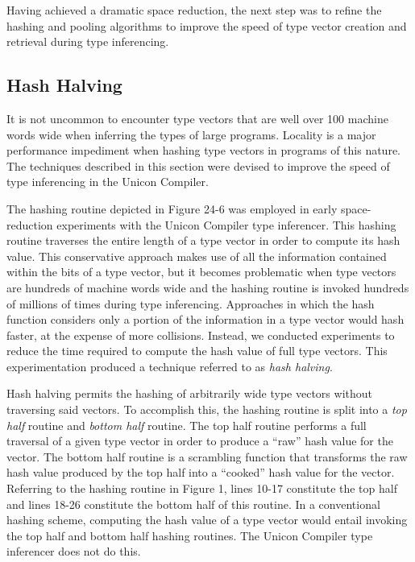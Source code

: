 Having achieved a dramatic space reduction, the next step was to
refine the hashing and pooling algorithms to improve the speed of type
vector creation and retrieval during type inferencing.

\subsection{Hash Halving}

It is not uncommon to encounter type vectors that are well over 100
machine words wide when inferring the types of large
programs. Locality is a major performance impediment when hashing type
vectors in programs of this nature. The techniques described in this
section were devised to improve the speed of type inferencing in the
Unicon Compiler.

The hashing routine depicted in Figure 24-6 was employed in early
space-reduction experiments with the Unicon Compiler type
inferencer. This hashing routine traverses the entire length of a type
vector in order to compute its hash value. This conservative approach
makes use of all the information contained within the bits of a type
vector, but it becomes problematic when type vectors are hundreds of
machine words wide and the hashing routine is invoked hundreds of
millions of times during type inferencing. Approaches in which the
hash function considers only a portion of the information in a type
vector would hash faster, at the expense of more collisions. Instead,
we conducted experiments to reduce the time required to compute the
hash value of full type vectors. This experimentation produced a
technique referred to as {\textit{hash halving}}.

Hash halving permits the hashing of arbitrarily wide type vectors
without traversing said vectors. To accomplish this, the hashing
routine is split into a {\textit{top half}} routine and
{\textit{bottom half}} routine. The top half routine performs a full
traversal of a given type vector in order to produce a ``raw'' hash
value for the vector. The bottom half routine is a scrambling function
that transforms the raw hash value produced by the top half into a
``cooked'' hash value for the vector. Referring to the hashing routine
in Figure 1, lines 10-17 constitute the top half and lines 18-26
constitute the bottom half of this routine. In a conventional hashing
scheme, computing the hash value of a type vector would entail
invoking the top half and bottom half hashing routines. The Unicon
Compiler type inferencer does not do this.

